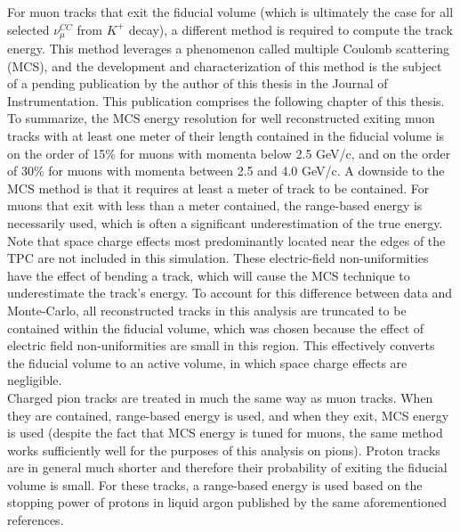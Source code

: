 For muon tracks that exit the fiducial volume (which is ultimately the case for all selected $\nu_\mu^{CC}$ from $K^+$ decay), a different method is required to compute the track energy. This method leverages a phenomenon called multiple Coulomb scattering (MCS), and the development and characterization of this method is the subject of a pending publication by the author of this thesis in the Journal of Instrumentation. This publication comprises the following chapter of this thesis. To summarize, the MCS energy resolution for well reconstructed exiting muon tracks with at least one meter of their length contained in the fiducial volume is on the order of 15\% for muons with momenta below 2.5 GeV/c, and on the order of 30\% for muons with momenta between 2.5 and 4.0 GeV/c. A downside to the MCS method is that it requires at least a meter of track to be contained. For muons that exit with less than a meter contained, the range-based energy is necessarily used, which is often a significant underestimation of the true energy. Note that space charge effects most predominantly located near the edges of the TPC are not included in this simulation. These electric-field non-uniformities have the effect of bending a track, which will cause the MCS technique to underestimate the track's energy. To account for this difference between data and Monte-Carlo, all reconstructed tracks in this analysis are truncated to be contained within the fiducial volume, which was chosen because the effect of electric field non-uniformities are small in this region. This effectively converts the fiducial volume to an active volume, in which space charge effects are negligible.\\

Charged pion tracks are treated in much the same way as muon tracks. When they are contained, range-based energy is used, and when they exit, MCS energy is used (despite the fact that MCS energy is tuned for muons, the same method works sufficiently well for the purposes of this analysis on pions). Proton tracks are in general much shorter and therefore their probability of exiting the fiducial volume is small. For these tracks, a range-based energy is used based on the stopping power of protons in liquid argon published by the same aforementioned references.\\

